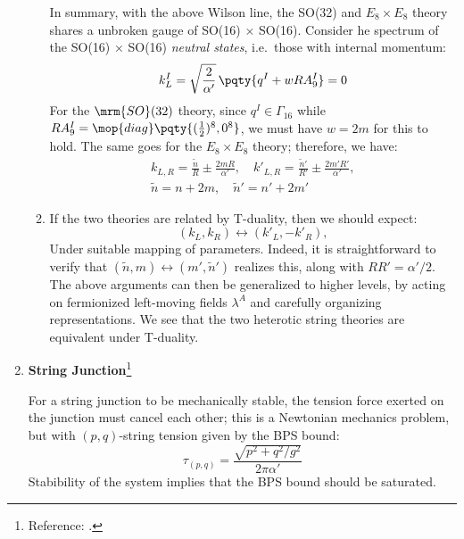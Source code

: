 \documentclass[a4paper,10pt]{article}
\begin{document}
\begin{enumerate}
\begin{enumerate}
	In summary, with the above Wilson line, the SO(32) and $E_8 \times E_8$ theory shares a unbroken gauge of SO(16) × SO(16). Consider he spectrum of the SO(16) × SO(16) \textit{neutral states}, i.e.\ those with internal momentum:
	\begin{equation}
		k^I_L
		= \sqrt{\frac{2}{\alpha'}}\,
			\pqty{
				q^I + w R A^I_9
			}
		= 0
	\end{equation}
	For the $\mrm{SO}(32)$ theory, since $q^I \in \Gamma_{16}$
	while $
		RA^I_9
		= \mop{diag} \pqty{
				(\tfrac{1}{2})^8,
				0^8
			}
	$, we must have $w = 2m$ for this to hold. The same goes for the $E_8 \times E_8$ theory;
	therefore, we have:
	\begin{gather}
		k_{L,R} = \frac{\tilde{n}}{R}
			\pm \frac{2mR}{\alpha'},
	\quad
		k'_{L,R} = \frac{\tilde{n}'}{R'}
			\pm \frac{2m'R'}{\alpha'},
	\\
		\tilde{n} = n + 2m,\quad
		\tilde{n}' = n' + 2m'
	\end{gather}
	
	\item If the two theories are related by T-duality, then we should expect:
	\begin{equation}
		(k_L, k_R) \longleftrightarrow (k'_L, −k'_R),
	\end{equation}
	Under suitable mapping of parameters. Indeed, it is straightforward to verify that $
		(\tilde{n},m)\leftrightarrow (m',\tilde{n}')
	$ realizes this, along with $
		RR' = \alpha'/2
	$. The above arguments can then be generalized to higher levels, by acting on fermionized left-moving fields $\lambda^A$ and carefully organizing representations. We see that the two heterotic string theories are equivalent under T-duality.
	\end{enumerate}

\item \textbf{String Junction}\footnote{
		Reference: . 
	}
	
	\nopagebreak
	For a string junction to be mechanically stable, the tension force exerted on the junction must cancel each other; this is a Newtonian mechanics problem, but with $(p,q)$-string tension given by the BPS bound:
	\begin{equation}
		\tau_{(p,q)}
		= \frac{\sqrt{p^2 + q^2/g^2}}{2\pi\alpha'}
	\end{equation}
	Stabibility of the system implies that the BPS bound should be saturated. 
	

\end{enumerate}
\end{document}
